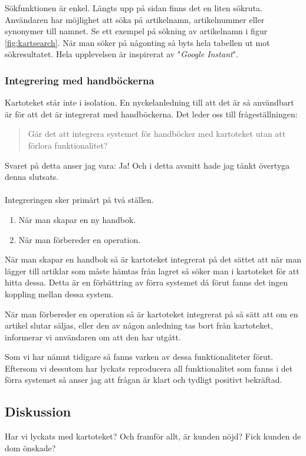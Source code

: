 Sökfunktionen är enkel.
Längts upp på sidan finns det en liten sökruta.
Användaren har möjlighet att söka på artikelnamn, artikelnummer
eller synonymer till namnet. Se ett exempel på sökning
av artikelnamn i figur \ref{fig:kartsearch}.
När man söker på någonting så byts hela tabellen ut mot sökresultatet.
Hela upplevelsen är inspirerat av "\textit{Google Instant}".

\clearpage
\subsubsection{Integrering med handböckerna}
Kartoteket står inte i isolation.
En nyckelanledning till att det är så användbart är
för att det är integrerat med handböckerna.
Det leder oss till frågeställningen:
\begin{quote}
  Går det att integrera systemet för handböcker med kartoteket utan att förlora funktionalitet?
\end{quote}
Svaret på detta anser jag vara: Ja!
Och i detta avsnitt hade jag tänkt övertyga denna slutsats.
\\\\
Integreringen sker primärt på två ställen.
\begin{enumerate}
  \item När man skapar en ny handbok.
  \item När man förbereder en operation.
\end{enumerate}

När man skapar en handbok så är kartoteket integrerat på det sättet att
när man lägger till artiklar som måste hämtas från lagret så söker man
i kartoteket för att hitta dessa. Detta är en förbättring av förra
systemet då förut fanns det ingen koppling mellan dessa system.

När man förbereder en operation så är kartoteket integrerat på
så sätt att om en artikel slutar säljas, eller den av någon anledning
tas bort från kartoteket, informerar vi användaren om att den
har utgått.

Som vi har nämnt tidigare så fanns varken av dessa funktionaliteter
förut. Eftersom vi dessutom har lyckats reproducera all funktionalitet
som fanns i det förra systemet så anser jag att frågan är klart och
tydligt positivt bekräftad.


\subsection{Diskussion}
Har vi lyckats med kartoteket? Och framför allt, är
kunden nöjd? Fick kunden de dom önskade?


